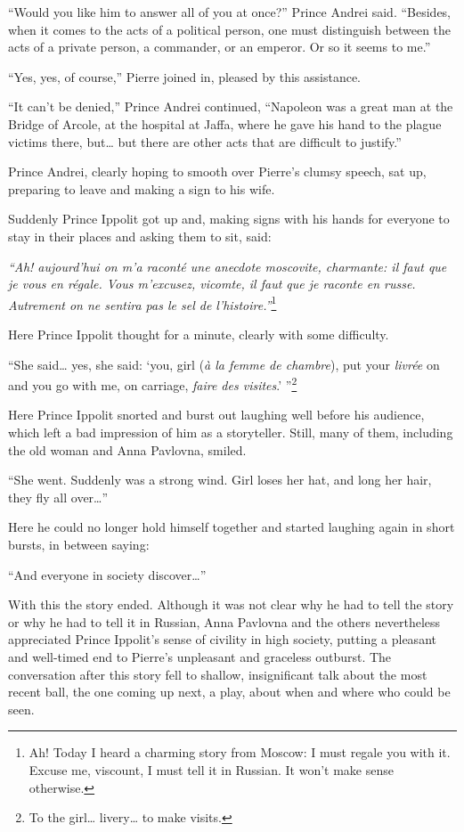 ``Would you like him to answer all of you at once?'' Prince Andrei
said. ``Besides, when it comes to the acts of a political person, one
must distinguish between the acts of a private person, a commander, or
an emperor. Or so it seems to me.''

``Yes, yes, of course,'' Pierre joined in, pleased by this
assistance.

``It can't be denied,'' Prince Andrei continued, ``Napoleon was a
great man at the Bridge of Arcole, at the hospital at Jaffa, where he
gave his hand to the plague victims there, but\ldots{} but there are
other acts that are difficult to justify.''

Prince Andrei, clearly hoping to smooth over Pierre's clumsy speech,
sat up, preparing to leave and making a sign to his wife.

Suddenly Prince Ippolit got up and, making signs with his hands for
everyone to stay in their places and asking them to sit, said:

\textit{``Ah! aujourd'hui on m'a racont\'e une anecdote moscovite,
  charmante: il faut que je vous en r\'egale. Vous m'excusez, vicomte,
  il faut que je raconte en russe. Autrement on ne sentira pas le sel
  de l'histoire.''}\footnote{Ah! Today I heard a charming story from
  Moscow: I must regale you with it. Excuse me, viscount, I must tell
  it in Russian. It won't make sense otherwise.}

Here Prince Ippolit thought for a minute, clearly with some
difficulty.

``She said\ldots{} yes, she said: `you, girl (\textit{\`a la femme de
  chambre}), put your \textit{livr\'ee} on and you go with me, on
carriage, \textit{faire des visites}.' ''\footnote{To the girl\ldots{}
  livery\ldots{} to make visits.}

Here Prince Ippolit snorted and burst out laughing well before his
audience, which left a bad impression of him as a storyteller. Still,
many of them, including the old woman and Anna Pavlovna, smiled.

``She went. Suddenly was a strong wind. Girl loses her hat, and long
her hair, they fly all over\ldots{}''

Here he could no longer hold himself together and started laughing
again in short bursts, in between saying:

``And everyone in society discover\ldots{}''

With this the story ended. Although it was not clear why he had to
tell the story or why he had to tell it in Russian, Anna Pavlovna and
the others nevertheless appreciated Prince Ippolit's sense of civility
in high society, putting a pleasant and well-timed end to Pierre's
unpleasant and graceless outburst. The conversation after this story
fell to shallow, insignificant talk about the most recent ball, the
one coming up next, a play, about when and where who could be
seen.


